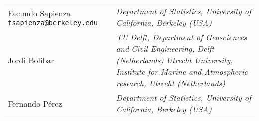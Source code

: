 


\begin{tabular}{p{5cm} p{10cm}}
Facundo Sapienza \newline \texttt{fsapienza@berkeley.edu} & \textit{Department of Statistics, University of California, Berkeley (USA)}\\[1cm]
Jordi Bolibar & \textit{TU Delft, Department of Geosciences and Civil Engineering, Delft (Netherlands)} \newline \textit{Utrecht University, Institute for Marine and Atmospheric research, Utrecht (Netherlands)}\\[2cm]
Fernando Pérez & \textit{Department of Statistics, University of California, Berkeley (USA)}\\[1cm]
\end{tabular}

